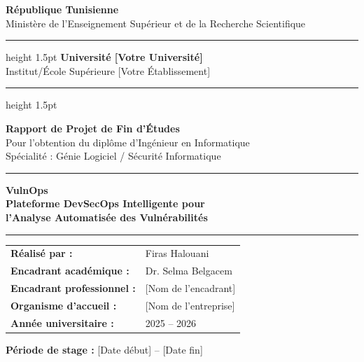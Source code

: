 \documentclass[12pt, a4paper, oneside]{report}
\begin{document}
\begin{titlepage}
    \centering
    \vspace*{1cm}

    {\large\textbf{République Tunisienne}}\\[0.3cm]
    {\large Ministère de l'Enseignement Supérieur et de la Recherche Scientifique}\\[0.5cm]
    \hrule height 1.5pt
    \vspace{0.3cm}
    {\Large\textbf{Université [Votre Université]}}\\[0.2cm]
    {\large Institut/École Supérieure [Votre Établissement]}\\[0.3cm]
    \hrule height 1.5pt

    \vspace{1.5cm}


    \vspace{0.5cm}
    {\LARGE\textbf{\textcolor{primaryblue}{Rapport de Projet de Fin d'Études}}}\\[0.3cm]
    {\large Pour l'obtention du diplôme d'Ingénieur en Informatique}\\[0.3cm]
    {\large Spécialité : Génie Logiciel / Sécurité Informatique}

    \vspace{1cm}
    \hrule
    \vspace{0.5cm}
    {\Huge\bfseries\textcolor{primaryblue}{VulnOps}}\\[0.4cm]
    {\Large\textbf{Plateforme DevSecOps Intelligente pour}}\\[0.2cm]
    {\Large\textbf{l'Analyse Automatisée des Vulnérabilités}}
    \vspace{0.5cm}
    \hrule

    \vspace{1.5cm}
    \begin{tabular}{ll}
        \textbf{Réalisé par :} & Firas Halouani \\[0.3cm]
        \textbf{Encadrant académique :} & Dr. Selma Belgacem \\[0.3cm]
        \textbf{Encadrant professionnel :} & [Nom de l'encadrant] \\[0.3cm]
        \textbf{Organisme d'accueil :} & [Nom de l'entreprise] \\[0.3cm]
        \textbf{Année universitaire :} & 2025 -- 2026 \\
    \end{tabular}

    \vfill
    {\large\textbf{Période de stage :} [Date début] -- [Date fin]}
\end{titlepage}
\end{document}
